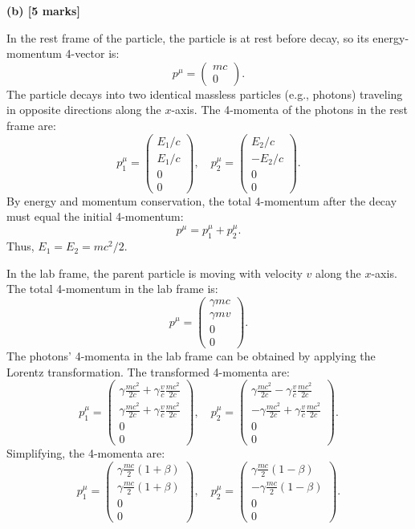 \textbf{(b) [5 marks]}

In the rest frame of the particle, the particle is at rest before decay, so its energy-momentum 4-vector is:
\[
p^\mu = \begin{pmatrix}
mc \\
0
\end{pmatrix}.
\]
The particle decays into two identical massless particles (e.g., photons) traveling in opposite directions along the \(x\)-axis. The 4-momenta of the photons in the rest frame are:
\[
p_1^\mu = \begin{pmatrix}
E_1/c \\
E_1/c \\
0 \\
0
\end{pmatrix}, \quad
p_2^\mu = \begin{pmatrix}
E_2/c \\
-E_2/c \\
0 \\
0
\end{pmatrix}.
\]
By energy and momentum conservation, the total 4-momentum after the decay must equal the initial 4-momentum:
\[
p^\mu = p_1^\mu + p_2^\mu.
\]
Thus, \(E_1 = E_2 = mc^2/2\).

In the lab frame, the parent particle is moving with velocity \(v\) along the \(x\)-axis. The total 4-momentum in the lab frame is:
\[
p^\mu = \begin{pmatrix}
\gamma mc \\
\gamma mv \\
0 \\
0
\end{pmatrix}.
\]
The photons’ 4-momenta in the lab frame can be obtained by applying the Lorentz transformation. The transformed 4-momenta are:
\[
p_1^\mu = \begin{pmatrix}
\gamma \frac{mc^2}{2c} + \gamma \frac{v}{c} \frac{mc^2}{2c} \\
\gamma \frac{mc^2}{2c} + \gamma \frac{v}{c} \frac{mc^2}{2c} \\
0 \\
0
\end{pmatrix}, \quad
p_2^\mu = \begin{pmatrix}
\gamma \frac{mc^2}{2c} - \gamma \frac{v}{c} \frac{mc^2}{2c} \\
-\gamma \frac{mc^2}{2c} + \gamma \frac{v}{c} \frac{mc^2}{2c} \\
0 \\
0
\end{pmatrix}.
\]
Simplifying, the 4-momenta are:
\[
p_1^\mu = \begin{pmatrix}
\gamma \frac{mc}{2} (1 + \beta) \\
\gamma \frac{mc}{2} (1 + \beta) \\
0 \\
0
\end{pmatrix}, \quad
p_2^\mu = \begin{pmatrix}
\gamma \frac{mc}{2} (1 - \beta) \\
-\gamma \frac{mc}{2} (1 - \beta) \\
0 \\
0
\end{pmatrix}.
\]

